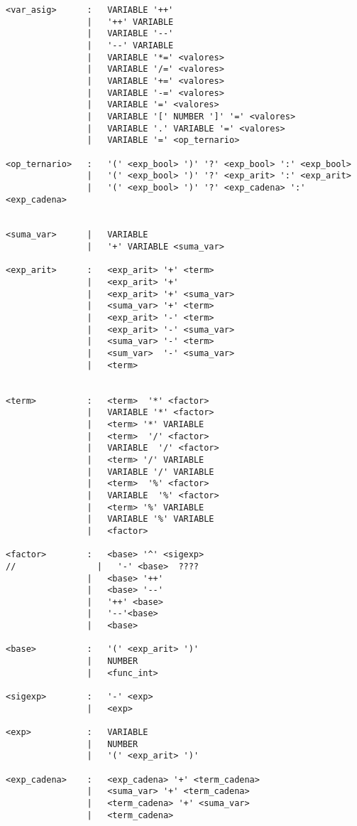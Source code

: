 \begin{verbatim}
<var_asig>      :   VARIABLE '++'
                |   '++' VARIABLE
                |   VARIABLE '--'
                |   '--' VARIABLE
                |   VARIABLE '*=' <valores>
                |   VARIABLE '/=' <valores>
                |   VARIABLE '+=' <valores>
                |   VARIABLE '-=' <valores>
                |   VARIABLE '=' <valores>
                |   VARIABLE '[' NUMBER ']' '=' <valores>
                |   VARIABLE '.' VARIABLE '=' <valores>
                |   VARIABLE '=' <op_ternario>

<op_ternario>   :   '(' <exp_bool> ')' '?' <exp_bool> ':' <exp_bool>
                |   '(' <exp_bool> ')' '?' <exp_arit> ':' <exp_arit>
                |   '(' <exp_bool> ')' '?' <exp_cadena> ':' <exp_cadena>


<suma_var>      |   VARIABLE
                |   '+' VARIABLE <suma_var>

<exp_arit>      :   <exp_arit> '+' <term>
                |   <exp_arit> '+' 
                |   <exp_arit> '+' <suma_var>
                |   <suma_var> '+' <term>
                |   <exp_arit> '-' <term>
                |   <exp_arit> '-' <suma_var>
                |   <suma_var> '-' <term>
                |   <sum_var>  '-' <suma_var>
                |   <term>


<term>          :   <term>  '*' <factor>
                |   VARIABLE '*' <factor>
                |   <term> '*' VARIABLE
                |   <term>  '/' <factor>
                |   VARIABLE  '/' <factor>
                |   <term> '/' VARIABLE
                |   VARIABLE '/' VARIABLE
                |   <term>  '%' <factor>
                |   VARIABLE  '%' <factor>
                |   <term> '%' VARIABLE
                |   VARIABLE '%' VARIABLE
                |   <factor>

<factor>        :   <base> '^' <sigexp>
//                |   '-' <base>  ????
                |   <base> '++'
                |   <base> '--'
                |   '++' <base>
                |   '--'<base>
                |   <base>

<base>          :   '(' <exp_arit> ')'
                |   NUMBER
                |   <func_int>

<sigexp>        :   '-' <exp>
                |   <exp>

<exp>           :   VARIABLE
                |   NUMBER
                |   '(' <exp_arit> ')'

<exp_cadena>    :   <exp_cadena> '+' <term_cadena>
                |   <suma_var> '+' <term_cadena>
                |   <term_cadena> '+' <suma_var>
                |   <term_cadena> 


\end{verbatim}
